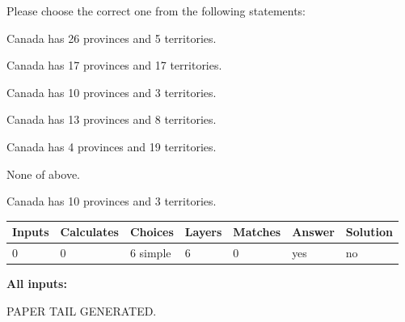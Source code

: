\documentclass[12pt]{article}
\begin{document}
  
Please choose the correct one from the following statements:
 
 
Canada has  26 provinces and  5 territories.
 
 
Canada has  17 provinces and  17 territories.
 
 
Canada has 10  provinces and 3 territories.
 
 
Canada has  13 provinces and  8 territories.
 
 
Canada has   4 provinces and  19 territories.
 
 
 None of above.
 
 
\noindent{}
 
 
Canada has 10  provinces and 3 territories.
 
 
\noindent{}
 
 
   
   
   
   
\noindent\begin{tabular}{|l|l|l|l|l|l|l|}
 \hline
Inputs & Calculates & Choices & Layers & Matches & Answer & Solution \\ \hline
 0  & 
 0  & 
 6
  simple  
  & 
 6  & 
 0  & 
  yes & 
  no 
  \\ \hline
 \end{tabular}
   
   
   
   
\noindent{}
   
   
   
   
\noindent\vspace{0.1in}\hspace{-0.08in} {\textbf{\Large{All inputs: }}}
   
   
   
   
   
   
 \vspace{0.2in}
 
   
   
\vspace{2.0in} PAPER TAIL GENERATED.
   
   
   
\end{document}
